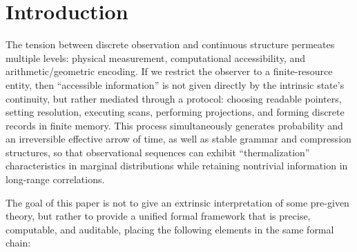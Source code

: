 \section{Introduction}

The tension between discrete observation and continuous structure permeates multiple levels: physical measurement, computational accessibility, and arithmetic/geometric encoding. If we restrict the observer to a finite-resource entity, then ``accessible information'' is not given directly by the intrinsic state's continuity, but rather mediated through a protocol: choosing readable pointers, setting resolution, executing scans, performing projections, and forming discrete records in finite memory. This process simultaneously generates probability and an irreversible effective arrow of time, as well as stable grammar and compression structures, so that observational sequences can exhibit ``thermalization'' characteristics in marginal distributions while retaining nontrivial information in long-range correlations.

The goal of this paper is not to give an extrinsic interpretation of some pre-given theory, but rather to provide a unified formal framework that is precise, computable, and auditable, placing the following elements in the same formal chain:

